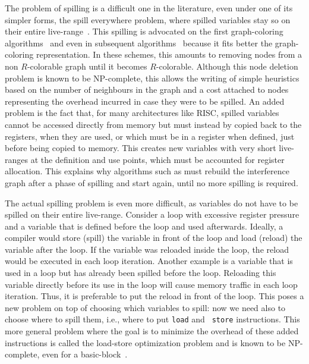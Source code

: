 {The problem of spilling is a difficult one in the literature, even under one of 
its simpler forms, the spill everywhere problem, where spilled variables stay 
so on their entire live-range~\cite{todo}. This spilling is advocated on the 
first graph-coloring algorithms~\cite{chaitin:1981:register} and even in subsequent 
algorithms~\cite{IRC} because it fits better the graph-coloring representation. 
In these schemes, this amounts to removing nodes from a non $R$-colorable graph 
until it becomes $R$-colorable. Although this node deletion problem is known to 
be NP-complete, this allows the writing of simple heuristics based on the 
number of neighbours in the graph and a cost attached to nodes representing the 
overhead incurred in case they were to be spilled. An added problem is the fact 
that, for many architectures like RISC, spilled variables cannot be accessed 
directly from memory but must instead by copied back to the registers, when 
they are used, or which must be in a register when defined, just before being 
copied to memory. This creates new variables with very short live-ranges at the 
definition and use points, which must be accounted for register allocation. 
This explains why algorithms such as \irc must rebuild the interference graph 
after a phase of spilling and start again, until no more spilling is required.


The actual spilling problem is even more difficult, as variables do not have to 
be spilled on their entire live-range.
Consider a loop with excessive register pressure and a variable that is defined 
before the loop and used afterwards. Ideally, a compiler would store (spill) 
the variable in front of the loop and load (reload) the variable after the 
loop. If the variable was reloaded inside the loop, the reload would be 
executed in each loop iteration. Another example is a variable that is used in 
a loop but has already been spilled before the loop. Reloading this variable 
directly before its use in the loop will cause memory traffic in each loop 
iteration. Thus, it is preferable to put the reload in front of the loop.
This poses a new problem on top of choosing which variables to spill: now we 
need also to choose where to spill them, i.e., where to put {\tt load} and {\tt 
store} instructions. This more general problem where the goal is to minimize 
the overhead of these added instructions is called the load-store optimization 
problem and is known to be NP-complete, even for a 
basic-block~\cite{Liberatore00}.  


}
